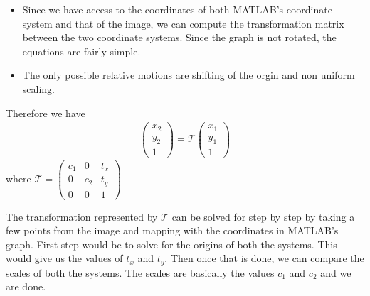 \documentclass[12pt]{article}
\begin{document}
    \begin{itemize}
        \item Since we have access to the coordinates of both MATLAB's coordinate system and that of the image, we can compute the 
        transformation matrix between the two coordinate systems. Since the graph is not rotated, the equations are fairly 
        simple.
        \item The only possible relative motions are shifting of the orgin and non uniform scaling.
    \end{itemize}

    Therefore we have 
    \begin{align}
        \begin{pmatrix}
            x_{2} \\
            y_{2} \\
            1
        \end{pmatrix}
        = \mathcal{T} 
        \begin{pmatrix}
            x_{1} \\
            y_{1} \\
            1
        \end{pmatrix}
    \end{align}
    where $\mathcal{T} = \begin{pmatrix}
                            c_{1} & 0 & t_{x} \\
                            0  & c_{2} & t_{y} \\
                            0 & 0 & 1
                        \end{pmatrix}$

    The transformation represented by $\mathcal{T}$ can be solved for step by step by taking a few points from the image 
    and mapping with the coordinates in MATLAB's graph. First step would be to solve for the origins of both the systems.
    This would give us the values of $t_{x}$ and $t_{y}$. Then once that is done, we can compare the scales of both 
    the systems. The scales are basically the values $c_{1}$ and $c_{2}$ and we are done.
\end{document}
